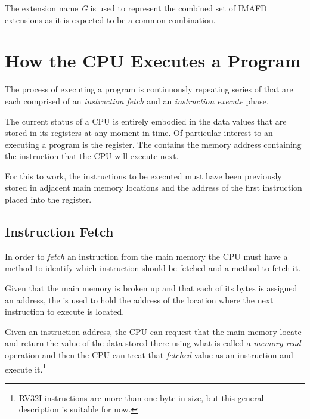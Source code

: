 %
The extension name {\em G} is used to represent the combined set of IMAFD
extensions as it is expected to be a common combination.




\section{How the CPU Executes a Program}

The process of executing a program is continuously repeating series of
 that are each comprised
of an {\em instruction fetch} and an {\em instruction execute} phase.
 
The current status of a CPU is entirely embodied in the data values that
are stored in its registers at any moment in time.  Of particular interest
to an executing a program is the  register.  The  contains
the memory address containing the instruction that the CPU will execute next.

For this to work, the instructions to be executed must have been previously 
stored in adjacent main memory locations and the address of the first instruction 
placed into the  register.


\subsection{Instruction Fetch}

In order to {\em fetch} an instruction from the main memory the CPU
must have a method to identify which instruction should be fetched and
a method to fetch it. 

Given that the main memory is broken up and that each of its bytes is 
assigned an address, the  is used to hold the address of the
location where the next instruction to execute is located.

Given an instruction address, the CPU can request that the main memory 
locate and return the value of the data stored there using what is called 
a {\em memory read} operation and then the CPU can treat that {\em fetched}
value as an instruction and execute it.\footnote{RV32I instructions are 
more than one byte in size, but this general description is suitable for now.}

